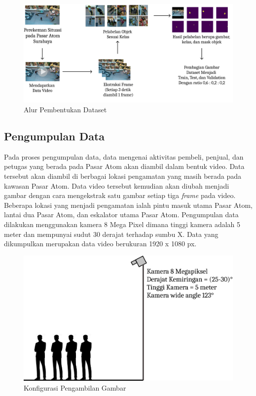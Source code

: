   \begin{figure}[h!]
    \begin{center}
      \includegraphics[width= 1.0\linewidth]{bab3/Pembentukan Dataset.png}
      \caption{Alur Pembentukan Dataset}
      \label{fig: base_method}
    \end{center}
  \end{figure}
  
  \subsection{Pengumpulan Data}
  Pada proses pengumpulan data, data mengenai aktivitas pembeli, penjual, dan petugas yang berada pada Pasar Atom
  akan diambil dalam bentuk video. Data tersebut akan diambil di berbagai lokasi pengamatan yang masih berada pada 
  kawasan Pasar Atom. Data video tersebut kemudian akan diubah menjadi gambar dengan cara mengekstrak satu gambar setiap
  tiga \textit{frame} pada video. Beberapa lokasi yang menjadi pengamatan ialah pintu masuk utama Pasar Atom, 
  lantai dua Pasar Atom, dan eskalator utama Pasar Atom. Pengumpulan data dilakukan menggunakan kamera 8 Mega Pixel dimana 
  tinggi kamera adalah 5 meter dan mempunyai sudut 30 derajat terhadap sumbu X. Data yang dikumpulkan merupakan data video
  berukuran 1920 x 1080 px.

  \begin{figure}[h!]
    \begin{center}
      \includegraphics[width= 0.7\linewidth]{bab3/Konfigurasi tinggi kamera.png}
      \caption{Konfigurasi Pengambilan Gambar}
      \label{fig: base_method}
    \end{center}
  \end{figure}
  
